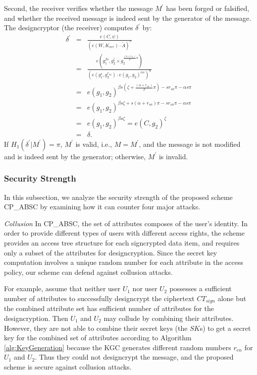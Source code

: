 \documentclass[letterpaper,12pt]{article}
\begin{document}
Second, the receiver verifies whether the message $M^\prime$ has been forged or falsified, and whether the received message is indeed sent by the generator of the message. The designcryptor (the receiver) computes $\delta^\prime$ by:
\begin{eqnarray*}
 \delta^\prime&=&\frac{e(C,\psi)}{(e(W,K_{ver})\cdot \tilde {A})^\pi}\\
 &=&\frac{e(g_1^{{\beta}s},g_2^{\zeta}\times g_2^{\frac{(\alpha+r_{sn})}{\beta}\pi})}{(e(g_1^s,g_2^{r_{sn}})\cdot e(g_1,g_2)^{{\alpha}s})^\pi}\\
 &=&e(g_1,g_2)^{\beta s (\zeta + {\frac{(\alpha+r_{sn})}{\beta}\pi}) - s r_{sn} \pi - \alpha s \pi}\\
 &=&e(g_1,g_2)^{\beta s \zeta + s (\alpha+r_{sn}) \pi - s r_{sn} \pi - \alpha s \pi}\\
 &=&e(g_1,g_2)^{\beta s \zeta}=e(C,g_2)^\zeta  \\
 &=& \delta.
\end{eqnarray*}
%
If $H_1(\delta^\prime|M^\prime) = \pi$,  $M^\prime$ is valid, i.e., $M = M^\prime$, and the message is not modified and is indeed sent by the generator; otherwise, $M^\prime$ is invalid.



\subsubsection{Security Strength}\label{subsec:security analysis}
In this subsection, we analyze the security strength of the proposed scheme CP\_ABSC by examining how it can counter four major attacks.

\emph{Collusion}\label{subsubsec:collusion attacks}
In CP\_ABSC, the set of attributes composes of the user's identity. In order to provide different types of users with different access rights, the scheme provides an access tree structure for each signcrypted data item, and requires only  a subset of the attributes for designcryption.  Since the secret key computation involves a unique random number for each attribute in the access policy, our scheme can defend against collusion attacks.

For example, assume that neither user $U_1$ nor user $U_2$ possesses a sufficient number of attributes to successfully designcrypt the ciphertext $CT_{sign}$ alone but the combined attribute set has sufficient number of attributes for the designcryption.  Then $U_1$ and $U_2$ may collude by combining their attributes. However, they are not able to combine their secret keys (the $SK$s) to get a secret key for the combined set of attributes according to Algorithm \ref{alg:KeyGeneration} because the KGC generates different random numbers $r_{en}$ for $U_1$ and $U_2$.
Thus they could not designcrypt the message, and the proposed scheme is secure against collusion attacks.
\end{document}
